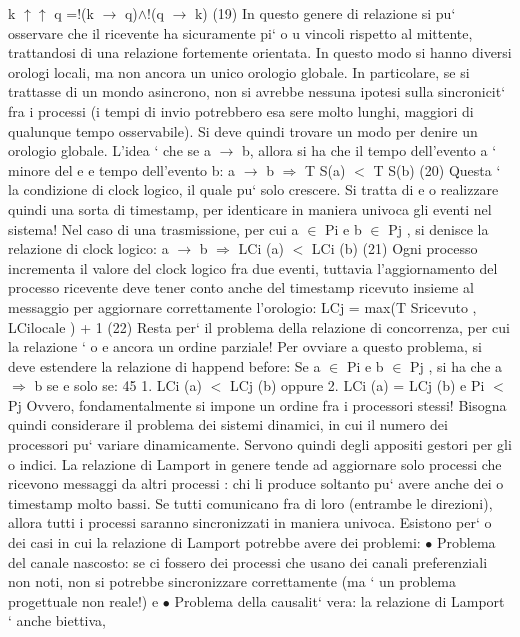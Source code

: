 \documentclass[a4paper,12pt]{article}
\begin{document}
k $\uparrow$$\uparrow$ q =!(k $\rightarrow$ q)$\land$!(q $\rightarrow$ k)
(19)
In questo genere di relazione si pu` osservare che il ricevente ha sicuramente pi`
o
u
vincoli rispetto al mittente, trattandosi di una relazione fortemente orientata.
In questo modo si hanno diversi orologi locali, ma non ancora un unico orologio globale. In particolare, se si trattasse
di un mondo asincrono, non si avrebbe
nessuna ipotesi sulla sincronicit` fra i processi (i tempi di invio potrebbero esa
sere molto lunghi, maggiori di qualunque tempo osservabile). Si deve quindi
trovare un modo per denire un orologio globale.
L'idea ` che se a $\rightarrow$ b, allora si ha che il tempo dell'evento a ` minore del
e
e
tempo dell'evento b:
a $\rightarrow$ b $\Rightarrow$ T S(a) $<$ T S(b)
(20)
Questa ` la condizione di clock logico, il quale pu` solo crescere. Si tratta di
e
o
realizzare quindi una sorta di timestamp, per identicare in maniera univoca gli
eventi nel sistema!
Nel caso di una trasmissione, per cui a $\in$ Pi e b $\in$ Pj , si denisce la relazione
di clock logico:
a $\rightarrow$ b $\Rightarrow$ LCi (a) $<$ LCi (b)
(21)
Ogni processo incrementa il valore del clock logico fra due eventi, tuttavia
l'aggiornamento del processo ricevente deve tener conto anche del timestamp
ricevuto insieme al messaggio per aggiornare correttamente l'orologio:
LCj = max(T Sricevuto , LCilocale ) + 1
(22)
Resta per` il problema della relazione di concorrenza, per cui la relazione `
o
e
ancora un ordine parziale! Per ovviare a questo problema, si deve estendere la
relazione di happend before:
Se a $\in$ Pi e b $\in$ Pj , si ha che a $\Rightarrow$ b se e solo se:
45
1. LCi (a) $<$ LCj (b) oppure
2. LCi (a) = LCj (b) e Pi $<$ Pj
Ovvero, fondamentalmente si impone un ordine fra i processori stessi! Bisogna
quindi considerare il problema dei sistemi dinamici, in cui il numero dei processori pu` variare dinamicamente. Servono
quindi degli appositi gestori per gli
o
indici.
La relazione di Lamport in genere tende ad aggiornare solo processi che
ricevono messaggi da altri processi : chi li produce soltanto pu` avere anche dei
o
timestamp molto bassi. Se tutti comunicano fra di loro (entrambe le direzioni),
allora tutti i processi saranno sincronizzati in maniera univoca. Esistono per`
o
dei casi in cui la relazione di Lamport potrebbe avere dei problemi:
$\bullet$ Problema del canale nascosto: se ci fossero dei processi che usano dei
canali preferenziali non noti, non si potrebbe sincronizzare correttamente
(ma ` un problema progettuale non reale!)
e
$\bullet$ Problema della causalit` vera: la relazione di Lamport ` anche biettiva,
$$
\end{document}
